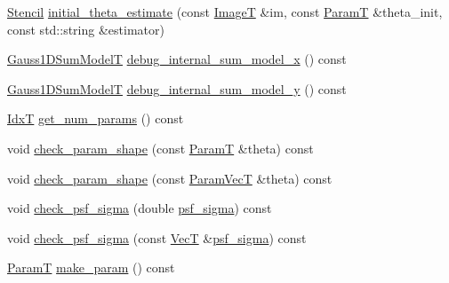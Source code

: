 \begin{DoxyCompactItemize}
\item 
\hyperlink{classmappel_1_1Gauss2DModel_1_1Stencil}{Stencil} \hyperlink{classmappel_1_1Gauss2DModel_a4bb4e53073e2c45b9a63b942214b787c}{initial\+\_\+theta\+\_\+estimate} (const \hyperlink{classmappel_1_1ImageFormat2DBase_a667ea5016648958e507e7db8eaa041b0}{ImageT} \&im, const \hyperlink{classmappel_1_1PointEmitterModel_a665ec6aea3aac139bb69a23c06d4b9a1}{ParamT} \&theta\+\_\+init, const std\+::string \&estimator)
\item 
\hyperlink{classmappel_1_1Gauss2DModel_a6e41ec1749814a91648caf394edd4385}{Gauss1\+D\+Sum\+ModelT} \hyperlink{classmappel_1_1Gauss2DModel_a74584ea8a12deee6fe3ec3343228f920}{debug\+\_\+internal\+\_\+sum\+\_\+model\+\_\+x} () const 
\item 
\hyperlink{classmappel_1_1Gauss2DModel_a6e41ec1749814a91648caf394edd4385}{Gauss1\+D\+Sum\+ModelT} \hyperlink{classmappel_1_1Gauss2DModel_a07e9c13f8a164f26f337fcc0c2f70374}{debug\+\_\+internal\+\_\+sum\+\_\+model\+\_\+y} () const 
\item 
\hyperlink{namespacemappel_ab17ec0f30b61ece292439d7ece81d3a8}{IdxT} \hyperlink{classmappel_1_1PointEmitterModel_a6fe8129bd24ab5c6620b3ab106b6c91a}{get\+\_\+num\+\_\+params} () const 
\item 
void \hyperlink{classmappel_1_1PointEmitterModel_a97a868e842302f670ed9f9bd49416771}{check\+\_\+param\+\_\+shape} (const \hyperlink{classmappel_1_1PointEmitterModel_a665ec6aea3aac139bb69a23c06d4b9a1}{ParamT} \&theta) const 
\item 
void \hyperlink{classmappel_1_1PointEmitterModel_a54b341a9bc0e32e2c8bbfe4ec0d8c9a1}{check\+\_\+param\+\_\+shape} (const \hyperlink{classmappel_1_1PointEmitterModel_add253b568d763f1513a810aac35de719}{Param\+VecT} \&theta) const 
\item 
void \hyperlink{classmappel_1_1PointEmitterModel_a01ce8d6358acbd2575be519dff1df89b}{check\+\_\+psf\+\_\+sigma} (double \hyperlink{classmappel_1_1Gauss2DModel_acb73f86ea080515e843f47be9502b271}{psf\+\_\+sigma}) const 
\item 
void \hyperlink{classmappel_1_1PointEmitterModel_a85780ca544a5ef5e0a62e74005081677}{check\+\_\+psf\+\_\+sigma} (const \hyperlink{namespacemappel_a2225ad69f358daa3f4f99282a35b9a3a}{VecT} \&\hyperlink{classmappel_1_1Gauss2DModel_acb73f86ea080515e843f47be9502b271}{psf\+\_\+sigma}) const 
\item 
\hyperlink{classmappel_1_1PointEmitterModel_a665ec6aea3aac139bb69a23c06d4b9a1}{ParamT} \hyperlink{classmappel_1_1PointEmitterModel_a1cd8ff64ce4132b6eaa8655696885749}{make\+\_\+param} () const 

\end{DoxyCompactItemize}
